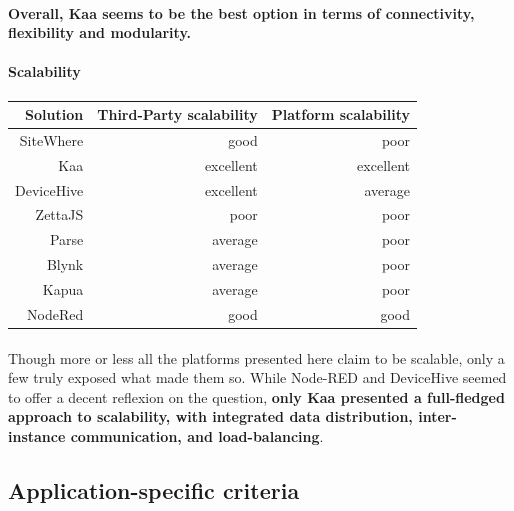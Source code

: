 \documentclass{article}
\begin{document}
\paragraph{} \textbf{Overall, Kaa seems to be the best option in terms of connectivity, flexibility and modularity.}

\paragraph{Scalability}

\begin{center}
\begin{tabular}{r|r|r}
Solution & Third-Party scalability & Platform scalability \\ \hline
SiteWhere & \cellcolor{blue!10}good & \cellcolor{orange!25}poor \\
Kaa & \cellcolor{green!25}excellent & \cellcolor{green!25}excellent \\
DeviceHive & \cellcolor{green!25}excellent & \cellcolor{yellow!25}average \\
ZettaJS & \cellcolor{orange!25}poor & \cellcolor{orange!25}poor \\
Parse & \cellcolor{yellow!25}average & \cellcolor{orange!25}poor \\
Blynk & \cellcolor{yellow!25}average & \cellcolor{orange!25}poor \\
Kapua & \cellcolor{yellow!25}average & \cellcolor{orange!25}poor \\
NodeRed & \cellcolor{blue!10}good & \cellcolor{blue!10}good \\
\end{tabular}
\end{center}

\paragraph{} Though more or less all the platforms presented here claim to be scalable, only a few truly exposed what made them so. While Node-RED and DeviceHive seemed to offer a decent reflexion on the question, \textbf{only Kaa presented a full-fledged approach to scalability, with integrated data distribution, inter-instance communication, and load-balancing}.

\subsection{Application-specific criteria}
\end{document}
